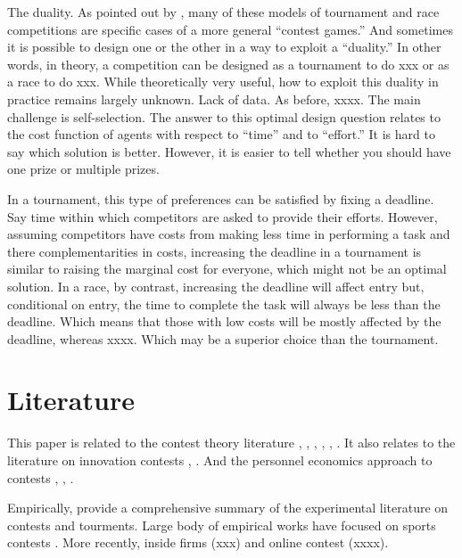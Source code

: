 \documentclass[12pt,]{article}
\begin{document}
The duality. As pointed out by \citet{baye2003strategic}, many of these
models of tournament and race competitions are specific cases of a more
general ``contest games.'' And sometimes it is possible to design one or
the other in a way to exploit a ``duality.'' In other words, in theory,
a competition can be designed as a tournament to do xxx or as a race to
do xxx. While theoretically very useful, how to exploit this duality in
practice remains largely unknown. Lack of data. As before, xxxx. The
main challenge is self-selection. The answer to this optimal design
question relates to the cost function of agents with respect to ``time''
and to ``effort.'' It is hard to say which solution is better. However,
it is easier to tell whether you should have one prize or multiple
prizes.

In a tournament, this type of preferences can be satisfied by fixing a
deadline. Say time within which competitors are asked to provide their
efforts. However, assuming competitors have costs from making less time
in performing a task and there complementarities in costs, increasing
the deadline in a tournament is similar to raising the marginal cost for
everyone, which might not be an optimal solution. In a race, by
contrast, increasing the deadline will affect entry but, conditional on
entry, the time to complete the task will always be less than the
deadline. Which means that those with low costs will be mostly affected
by the deadline, whereas xxxx. Which may be a superior choice than the
tournament.

\section{Literature}\label{literature}

This paper is related to the contest theory literature
\citet{dixit1987strategic} \citet{baye2003strategic},
\citet{parreiras2010contests}, \citet{moldovanu2001optimal},
\citet{moldovanu2006contest}, \citet{siegel2009all},
\citet{siegel2014contests}. It also relates to the literature on
innovation contests \citet{taylor1995digging}, \citet{che2003optimal}.
And the personnel economics approach to contests \citet{lazear1981rank},
\citet{green1983comparison}, \citet{mary1984economic}.

Empirically, \citet{dechenaux2014survey} provide a comprehensive summary
of the experimental literature on contests and tourments. Large body of
empirical works have focused on sports contests
\citet{szymanski2003economic}. More recently, inside firms (xxx) and
online contest (xxxx).
\end{document}

